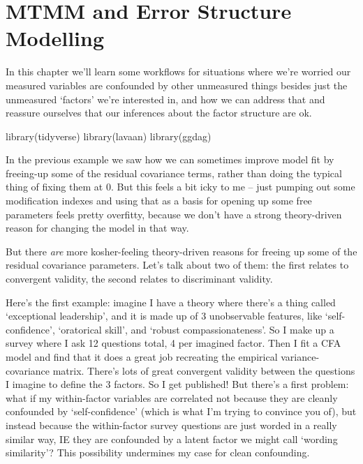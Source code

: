 \documentclass[
  letterpaper,
  DIV=11,
  numbers=noendperiod]{scrreprt}
\newenvironment{Shaded}{\begin{snugshade}}{\end{snugshade}}
\newcommand{\FunctionTok}[1]{\textcolor[rgb]{0.28,0.35,0.67}{#1}}
\newcommand{\NormalTok}[1]{\textcolor[rgb]{0.00,0.23,0.31}{#1}}
\begin{document}
\hypertarget{sec-mtmm}{%
\chapter{MTMM and Error Structure Modelling}\label{sec-mtmm}}

In this chapter we'll learn some workflows for situations where we're
worried our measured variables are confounded by other unmeasured things
besides just the unmeasured `factors' we're interested in, and how we
can address that and reassure ourselves that our inferences about the
factor structure are ok.

\begin{Shaded}
\begin{Highlighting}[]
\FunctionTok{library}\NormalTok{(tidyverse)}
\FunctionTok{library}\NormalTok{(lavaan)}
\FunctionTok{library}\NormalTok{(ggdag)}
\end{Highlighting}
\end{Shaded}

In the previous example we saw how we can sometimes improve model fit by
freeing-up some of the residual covariance terms, rather than doing the
typical thing of fixing them at 0. But this feels a bit icky to me --
just pumping out some modification indexes and using that as a basis for
opening up some free parameters feels pretty overfitty, because we don't
have a strong theory-driven reason for changing the model in that way.

But there \emph{are} more kosher-feeling theory-driven reasons for
freeing up some of the residual covariance parameters. Let's talk about
two of them: the first relates to convergent validity, the second
relates to discriminant validity.

Here's the first example: imagine I have a theory where there's a thing
called `exceptional leadership', and it is made up of 3 unobservable
features, like `self-confidence', `oratorical skill', and `robust
compassionateness'. So I make up a survey where I ask 12 questions
total, 4 per imagined factor. Then I fit a CFA model and find that it
does a great job recreating the empirical variance-covariance matrix.
There's lots of great convergent validity between the questions I
imagine to define the 3 factors. So I get published! But there's a first
problem: what if my within-factor variables are correlated not because
they are cleanly confounded by `self-confidence' (which is what I'm
trying to convince you of), but instead because the within-factor survey
questions are just worded in a really similar way, IE they are
confounded by a latent factor we might call `wording similarity'? This
possibility undermines my case for clean confounding.
\end{document}
